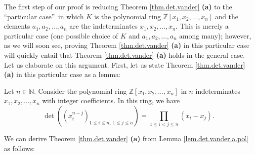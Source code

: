 The first step of our proof is reducing Theorem \ref{thm.det.vander}
\textbf{(a)} to the \textquotedblleft particular case\textquotedblright\ in
which $K$ is the polynomial ring $\mathbb{Z}\left[  x_{1},x_{2},\ldots
,x_{n}\right]  $ and the elements $a_{1},a_{2},\ldots,a_{n}$ are the
indeterminates $x_{1},x_{2},\ldots,x_{n}$. This is merely a particular case
(one possible choice of $K$ and $a_{1},a_{2},\ldots,a_{n}$ among many);
however, as we will soon see, proving Theorem \ref{thm.det.vander}
\textbf{(a)} in this particular case will quickly entail that Theorem
\ref{thm.det.vander} \textbf{(a)} holds in the general case. Let us elaborate
on this argument. First, let us state Theorem \ref{thm.det.vander}
\textbf{(a)} in this particular case as a lemma:

\begin{lemma}
\label{lem.det.vander.a.pol}Let $n\in\mathbb{N}$. Consider the polynomial ring
$\mathbb{Z}\left[  x_{1},x_{2},\ldots,x_{n}\right]  $ in $n$ indeterminates
$x_{1},x_{2},\ldots,x_{n}$ with integer coefficients. In this ring, we have%
\begin{equation}
\det\left(  \left(  x_{i}^{n-j}\right)  _{1\leq i\leq n,\ 1\leq j\leq
n}\right)  =\prod_{1\leq i<j\leq n}\left(  x_{i}-x_{j}\right)  .
\label{eq.lem.det.vander.a.pol.1}%
\end{equation}

\end{lemma}

We can derive Theorem \ref{thm.det.vander} \textbf{(a)} from Lemma
\ref{lem.det.vander.a.pol} as follows:

